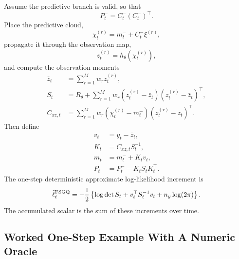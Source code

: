 \documentclass[11pt]{article}
\numberwithin{equation}{section}
\newcommand{\ellhat}{\widehat\ell}
\begin{document}
Assume the predictive branch is valid, so that
\begin{equation}
  P_t^-=C_t^-(C_t^-)^\top.
  \label{eq:p31-pred-factor}
\end{equation}
Place the predictive cloud,
\begin{equation}
  \chi_t^{(r)}=m_t^-+C_t^-\xi^{(r)},
  \label{eq:p31-obs-placed-points}
\end{equation}
propagate it through the observation map,
\begin{equation}
  z_t^{(r)}=h_\theta(\chi_t^{(r)}),
  \label{eq:p31-obs-values}
\end{equation}
and compute the observation moments
\begin{align}
  \bar z_t &= \sum_{r=1}^{M}w_r z_t^{(r)},
  \label{eq:p31-obs-mean}\\
  S_t &= R_\theta+
  \sum_{r=1}^{M}w_r(z_t^{(r)}-\bar z_t)(z_t^{(r)}-\bar z_t)^\top,
  \label{eq:p31-S-cloud}\\
  C_{xz,t} &= \sum_{r=1}^{M}w_r(\chi_t^{(r)}-m_t^-)(z_t^{(r)}-\bar z_t)^\top.
  \label{eq:p31-cross-cov}
\end{align}
Then define
\begin{align}
  v_t &= y_t-\bar z_t,
  \label{eq:p31-innovation}\\
  K_t &= C_{xz,t}S_t^{-1},
  \label{eq:p31-kalman-gain}\\
  m_t &= m_t^-+K_t v_t,
  \label{eq:p31-filter-mean}\\
  P_t &= P_t^- - K_tS_tK_t^\top.
  \label{eq:p31-filter-cov}
\end{align}
The one-step deterministic approximate log-likelihood increment is
\begin{equation}
  \ellhat_t^{\rm FSGQ}
  =
  -\frac12
  \left\{
    \log\det S_t + v_t^\top S_t^{-1}v_t + n_y\log(2\pi)
  \right\}.
  \label{eq:p31-fsgq-loglik}
\end{equation}
The accumulated scalar is the sum of these increments over time.

\subsection{Worked One-Step Example With A Numeric Oracle}
\label{sec:p32-worked-example}
\end{document}
